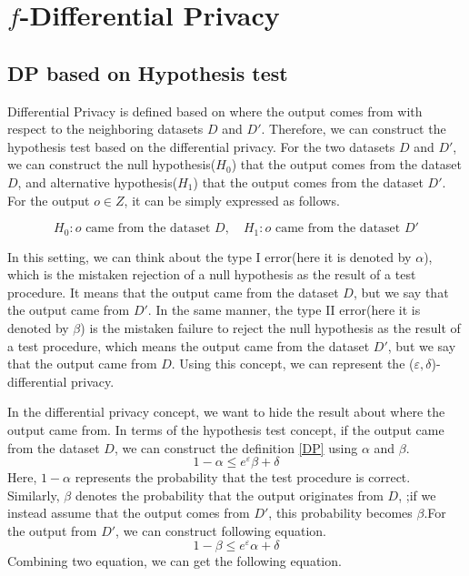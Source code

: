 \documentclass{article}
\begin{document}
\section{\texorpdfstring{$f$}{f}-Differential Privacy}
\subsection{DP based on Hypothesis test}
Differential Privacy is defined based on where the output comes from with respect to the neighboring datasets $D$ and $D'$. Therefore, we can construct the hypothesis test based on the differential privacy. For the two datasets $D$ and $D'$, we can construct the null hypothesis($H_0$) that the output comes from the dataset $D$, and alternative hypothesis($H_1$) that the output comes from the dataset $D'$. For the output $o \in Z$, it can be simply expressed as follows.

\begin{equation*}
H_0 : \text{$o$ came from the dataset $D$}, \quad H_1: \text{$o$ came from the dataset $D'$}    
\end{equation*}

In this setting, we can think about the type I error(here it is denoted by $\alpha$), which is the mistaken rejection of a null hypothesis as the result of a test procedure. It means that the output came from the dataset $D$, but we say that the output came from $D'$. In the same manner, the type II error(here it is denoted by $\beta$) is the mistaken failure to reject the null hypothesis as the result of a test procedure, which means the output came from the dataset $D'$, but we say that the output came from $D$. Using this concept, we can represent the ($\varepsilon,\delta$)-differential privacy.

In the differential privacy concept, we want to hide the result about where the output came from. In terms of the hypothesis test concept, if the output came from the dataset $D$, we can construct the definition \ref{DP} using $\alpha$ and $\beta$.
\begin{equation*}
    1-\alpha \le e^\varepsilon \beta +\delta
\end{equation*}
Here, $1- \alpha$ represents the probability that the test procedure is correct. Similarly, $\beta$ denotes the probability that the output originates from $D$, ;if we instead assume that the output comes from $D'$, this probability becomes $\beta$.For the output from $D'$, we can construct following equation.
\begin{equation*}
    1-\beta \le e^\varepsilon \alpha + \delta
\end{equation*}
Combining two equation, we can get the following equation.
\end{document}
